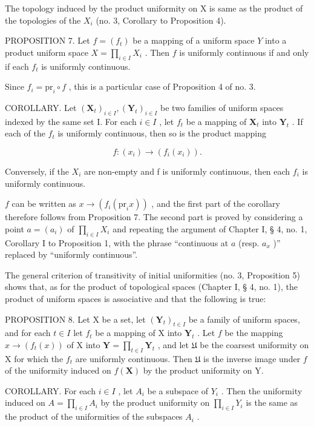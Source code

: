 The topology induced by the product uniformity on X is same as the product of the topologies of the \(X_{i}\) (no. 3, Corollary to Proposition 4).

PROPOSITION 7. Let \(f = (f_{t})\) be a mapping of a uniform space \(Y\) into a product uniform space \(X = \prod_{i \in I} X_{i}\) . Then \(f\) is uniformly continuous if and only if each \(f_{t}\) is uniformly continuous.

Since \(f_{i} = \mathrm{pr}_{i} \circ f\) , this is a particular case of Proposition 4 of no. 3.

COROLLARY. Let \((\mathbf{X}_t)_{i \in I}, (\mathbf{Y}_t)_{i \in I}\) be two families of uniform spaces indexed by the same set I. For each \(i \in I\) , let \(f_t\) be a mapping of \(\mathbf{X}_t\) into \(\mathbf{Y}_t\) . If each of the \(f_t\) is uniformly continuous, then so is the product mapping

\[
f: (x _ {i}) \rightarrow (f _ {i} (x _ {i})).
\]

Conversely, if the \(X_{i}\) are non-empty and f is uniformly continuous, then each \(f_{i}\) is uniformly continuous.

\(f\) can be written as \(x \to (f_{i}(\mathrm{pr}_{i}x))\) , and the first part of the corollary therefore follows from Proposition 7. The second part is proved by considering a point \(a = (a_{i})\) of \(\prod_{i \in I} X_{i}\) and repeating the argument of Chapter I, § 4, no. 1, Corollary I to Proposition 1, with the phrase ``continuous at \(a\) (resp. \(a_{x}\) )'' replaced by ``uniformly continuous''.

The general criterion of transitivity of initial uniformities (no. 3, Proposition 5) shows that, as for the product of topological spaces (Chapter I, § 4, no. 1), the product of uniform spaces is associative and that the following is true:

PROPOSITION 8. Let X be a set, let \((\mathbf{Y}_t)_{t \in I}\) be a family of uniform spaces, and for each \(t \in I\) let \(f_t\) be a mapping of X into \(\mathbf{Y}_t\) . Let \(f\) be the mapping \(x \to (f_t(x))\) of X into \(\mathbf{Y} = \prod_{t \in I} \mathbf{Y}_t\) , and let \(\mathfrak{U}\) be the coarsest uniformity on X for which the \(f_t\) are uniformly continuous. Then \(\mathfrak{U}\) is the inverse image under \(f\) of the uniformity induced on \(f(\mathbf{X})\) by the product uniformity on Y.

COROLLARY. For each \(i \in I\) , let \(A_{i}\) be a subspace of \(Y_{i}\) . Then the uniformity induced on \(A = \prod_{i \in I} A_{i}\) by the product uniformity on \(\prod_{i \in I} Y_{i}\) is the same as the product of the uniformities of the subspaces \(A_{i}\) .

